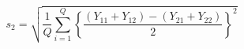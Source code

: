 

\[
s_2 = \sqrt{\frac{1}{Q}\sum_{i=1}^{Q}{\left\{\frac{(Y_{11} + Y_{12}) - (Y_{21} + Y_{22})}{2}\right\}^2}}
\]


